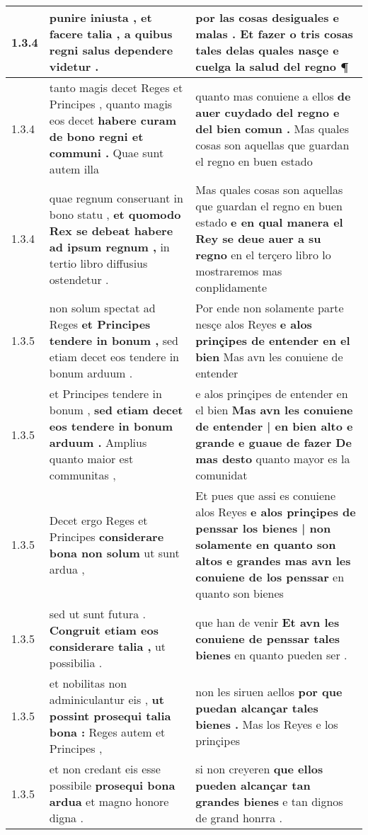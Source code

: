 \begin{tabular}{|p{1cm}|p{6.5cm}|p{6.5cm}|}
1.3.4 & punire iniusta , \textbf{ et facere talia , } a quibus regni salus dependere videtur . & por las cosas desiguales e malas . \textbf{ Et fazer o tris cosas tales delas quales nasçe e cuelga la salud del regno } ¶ \\\hline
1.3.4 & tanto magis decet Reges et Principes , quanto magis eos decet \textbf{ habere curam de bono regni et communi . } Quae sunt autem illa & quanto mas conuiene a ellos \textbf{ de auer cuydado del regno e del bien comun . } Mas quales cosas son aquellas que guardan el regno en buen estado \\\hline
1.3.4 & quae regnum conseruant in bono statu , \textbf{ et quomodo Rex se debeat habere ad ipsum regnum , } in tertio libro diffusius ostendetur . & Mas quales cosas son aquellas que guardan el regno en buen estado \textbf{ e en qual manera el Rey se deue auer a su regno } en el terçero libro lo mostraremos mas conplidamente \\\hline
1.3.5 & non solum spectat ad Reges \textbf{ et Principes tendere in bonum , } sed etiam decet eos tendere in bonum arduum . & Por ende non solamente parte nesçe alos Reyes \textbf{ e alos prinçipes de entender en el bien } Mas avn les conuiene de entender \\\hline
1.3.5 & et Principes tendere in bonum , \textbf{ sed etiam decet eos tendere in bonum arduum . } Amplius quanto maior est communitas , & e alos prinçipes de entender en el bien \textbf{ Mas avn les conuiene de entender | en bien alto e grande e guaue de fazer De mas desto } quanto mayor es la comunidat \\\hline
1.3.5 & Decet ergo Reges et Principes \textbf{ considerare bona non solum } ut sunt ardua , & Et pues que assi es conuiene alos Reyes \textbf{ e alos prinçipes de penssar los bienes | non solamente en quanto son altos e grandes mas avn les conuiene de los penssar } en quanto son bienes \\\hline
1.3.5 & sed ut sunt futura . \textbf{ Congruit etiam eos considerare talia , } ut possibilia . & que han de venir \textbf{ Et avn les conuiene de penssar tales bienes } en quanto pueden ser . \\\hline
1.3.5 & et nobilitas non adminiculantur eis , \textbf{ ut possint prosequi talia bona : } Reges autem et Principes , & non les siruen aellos \textbf{ por que puedan alcançar tales bienes . } Mas los Reyes e los prinçipes \\\hline
1.3.5 & et non credant eis esse possibile \textbf{ prosequi bona ardua } et magno honore digna . & si non creyeren \textbf{ que ellos pueden alcançar tan grandes bienes } e tan dignos de grand honrra . \\\hline

\end{tabular}
